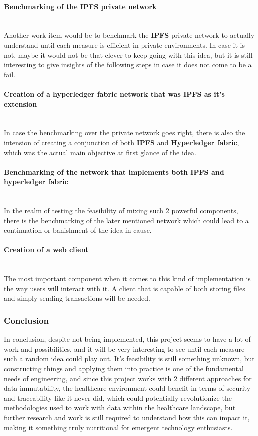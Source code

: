 \paragraph{Benchmarking of the IPFS private network} \mbox{} \\
Another work item would be to benchmark the \textbf{IPFS} private network to actually understand until each measure is efficient in private environments. In case it is not, maybe it would not be that clever to keep going with this idea, but it is still interesting to give insights of the following steps in case it does not come to be a fail.

\paragraph{Creation of a hyperledger fabric network that was IPFS as it's extension} \mbox{} \\
In case the benchmarking over the private network goes right, there is also the intension of creating a conjunction of both \textbf{IPFS} and \textbf{Hyperledger fabric}, which was the actual main objective at first glance of the idea.

\paragraph{Benchmarking of the network that implements both IPFS and hyperledger fabric} \mbox{} \\
In the realm of testing the feasibility of mixing such 2 powerful components, there is the benchmarking of the later mentioned network which could lead to a continuation or banishment of the idea in cause.

\paragraph{Creation of a web client} \mbox{} \\
The most important component when it comes to this kind of implementation is the way users will interact with it. A client that is capable of both storing files and simply sending transactions will be needed.

\subsubsection{Conclusion} 
In conclusion, despite not being implemented, this project seems to have a lot of work and possibilities, and it will be very interesting to see until each measure such a random idea could play out. It's feasibility is still something unknown, but constructing things and applying them into practice is one of the fundamental needs of engineering, and since this project works with 2 different approaches for data immutability, the healthcare environment could benefit in terms of security and traceability like it never did, which could potentially revolutionize the methodologies used to work with data within the healthcare landscape, but further research and work is still required to understand how this can impact it, making it something truly nutritional for emergent technology enthusiasts.

